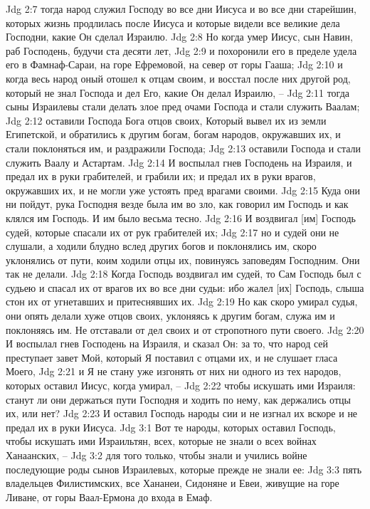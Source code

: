Jdg 2:7  тогда народ служил Господу во все дни Иисуса и во все дни старейшин, которых жизнь продлилась после Иисуса и которые видели все великие дела Господни, какие Он сделал Израилю.
Jdg 2:8  Но когда умер Иисус, сын Навин, раб Господень, будучи ста десяти лет,
Jdg 2:9  и похоронили его в пределе удела его в Фамнаф-Сараи, на горе Ефремовой, на север от горы Гааша;
Jdg 2:10  и когда весь народ оный отошел к отцам своим, и восстал после них другой род, который не знал Господа и дел Его, какие Он делал Израилю, --
Jdg 2:11  тогда сыны Израилевы стали делать злое пред очами Господа и стали служить Ваалам;
Jdg 2:12  оставили Господа Бога отцов своих, Который вывел их из земли Египетской, и обратились к другим богам, богам народов, окружавших их, и стали поклоняться им, и раздражили Господа;
Jdg 2:13  оставили Господа и стали служить Ваалу и Астартам.
Jdg 2:14  И воспылал гнев Господень на Израиля, и предал их в руки грабителей, и грабили их; и предал их в руки врагов, окружавших их, и не могли уже устоять пред врагами своими.
Jdg 2:15  Куда они ни пойдут, рука Господня везде была им во зло, как говорил им Господь и как клялся им Господь. И им было весьма тесно.
Jdg 2:16  И воздвигал [им] Господь судей, которые спасали их от рук грабителей их;
Jdg 2:17  но и судей они не слушали, а ходили блудно вслед других богов и поклонялись им, скоро уклонялись от пути, коим ходили отцы их, повинуясь заповедям Господним. Они так не делали.
Jdg 2:18  Когда Господь воздвигал им судей, то Сам Господь был с судьею и спасал их от врагов их во все дни судьи: ибо жалел [их] Господь, слыша стон их от угнетавших и притеснявших их.
Jdg 2:19  Но как скоро умирал судья, они опять делали хуже отцов своих, уклоняясь к другим богам, служа им и поклоняясь им. Не отставали от дел своих и от стропотного пути своего.
Jdg 2:20  И воспылал гнев Господень на Израиля, и сказал Он: за то, что народ сей преступает завет Мой, который Я поставил с отцами их, и не слушает гласа Моего,
Jdg 2:21  и Я не стану уже изгонять от них ни одного из тех народов, которых оставил Иисус, когда умирал, --
Jdg 2:22  чтобы искушать ими Израиля: станут ли они держаться пути Господня и ходить по нему, как держались отцы их, или нет?
Jdg 2:23  И оставил Господь народы сии и не изгнал их вскоре и не предал их в руки Иисуса.
Jdg 3:1  Вот те народы, которых оставил Господь, чтобы искушать ими Израильтян, всех, которые не знали о всех войнах Ханаанских, --
Jdg 3:2  для того только, чтобы знали и учились войне последующие роды сынов Израилевых, которые прежде не знали ее:
Jdg 3:3  пять владельцев Филистимских, все Хананеи, Сидоняне и Евеи, живущие на горе Ливане, от горы Ваал-Ермона до входа в Емаф.
